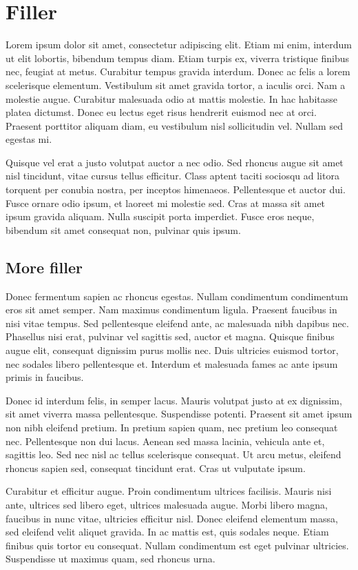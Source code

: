 \section{Filler}
Lorem ipsum dolor sit amet, consectetur adipiscing elit. Etiam mi enim, interdum ut elit lobortis, bibendum tempus diam. Etiam turpis ex, viverra tristique finibus nec, feugiat at metus. Curabitur tempus gravida interdum. Donec ac felis a lorem scelerisque elementum. Vestibulum sit amet gravida tortor, a iaculis orci. Nam a molestie augue. Curabitur malesuada odio at mattis molestie. In hac habitasse platea dictumst. Donec eu lectus eget risus hendrerit euismod nec at orci. Praesent porttitor aliquam diam, eu vestibulum nisl sollicitudin vel. Nullam sed egestas mi.

Quisque vel erat a justo volutpat auctor a nec odio. Sed rhoncus augue sit amet nisl tincidunt, vitae cursus tellus efficitur. Class aptent taciti sociosqu ad litora torquent per conubia nostra, per inceptos himenaeos. Pellentesque et auctor dui. Fusce ornare odio ipsum, et laoreet mi molestie sed. Cras at massa sit amet ipsum gravida aliquam. Nulla suscipit porta imperdiet. Fusce eros neque, bibendum sit amet consequat non, pulvinar quis ipsum.

\subsection{More filler}
Donec fermentum sapien ac rhoncus egestas. Nullam condimentum condimentum eros sit amet semper. Nam maximus condimentum ligula. Praesent faucibus in nisi vitae tempus. Sed pellentesque eleifend ante, ac malesuada nibh dapibus nec. Phasellus nisi erat, pulvinar vel sagittis sed, auctor et magna. Quisque finibus augue elit, consequat dignissim purus mollis nec. Duis ultricies euismod tortor, nec sodales libero pellentesque et. Interdum et malesuada fames ac ante ipsum primis in faucibus.

Donec id interdum felis, in semper lacus. Mauris volutpat justo at ex dignissim, sit amet viverra massa pellentesque. Suspendisse potenti. Praesent sit amet ipsum non nibh eleifend pretium. In pretium sapien quam, nec pretium leo consequat nec. Pellentesque non dui lacus. Aenean sed massa lacinia, vehicula ante et, sagittis leo. Sed nec nisl ac tellus scelerisque consequat. Ut arcu metus, eleifend rhoncus sapien sed, consequat tincidunt erat. Cras ut vulputate ipsum.

Curabitur et efficitur augue. Proin condimentum ultrices facilisis. Mauris nisi ante, ultrices sed libero eget, ultrices malesuada augue. Morbi libero magna, faucibus in nunc vitae, ultricies efficitur nisl. Donec eleifend elementum massa, sed eleifend velit aliquet gravida. In ac mattis est, quis sodales neque. Etiam finibus quis tortor eu consequat. Nullam condimentum est eget pulvinar ultricies. Suspendisse ut maximus quam, sed rhoncus urna.

